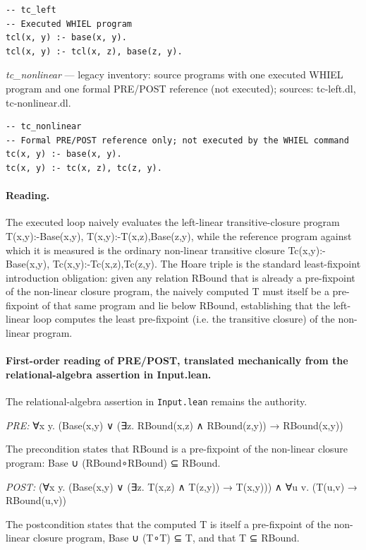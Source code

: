 \documentclass[10pt]{article}
\begin{document}
\begin{Verbatim}[fontsize=\scriptsize,breaklines=true,breakanywhere=true,frame=single,framesep=1.5mm]
-- tc_left
-- Executed WHIEL program
tcl(x, y) :- base(x, y).
tcl(x, y) :- tcl(x, z), base(z, y).
\end{Verbatim}

{\raggedright\textit{tc\_nonlinear} --- legacy inventory: source programs with one executed WHIEL program and one formal PRE/POST reference (not executed); sources: tc-left.dl, tc-nonlinear.dl.\par}

\begin{Verbatim}[fontsize=\scriptsize,breaklines=true,breakanywhere=true,frame=single,framesep=1.5mm]
-- tc_nonlinear
-- Formal PRE/POST reference only; not executed by the WHIEL command
tc(x, y) :- base(x, y).
tc(x, y) :- tc(x, z), tc(z, y).
\end{Verbatim}

\paragraph{Reading.} The executed loop naively evaluates the left-linear transitive-closure program T(x,y):-Base(x,y), T(x,y):-T(x,z),Base(z,y), while the reference program against which it is measured is the ordinary non-linear transitive closure Tc(x,y):-Base(x,y), Tc(x,y):-Tc(x,z),Tc(z,y). The Hoare triple is the standard least-fixpoint introduction obligation: given any relation RBound that is already a pre-fixpoint of the non-linear closure program, the naively computed T must itself be a pre-fixpoint of that same program and lie below RBound, establishing that the left-linear loop computes the least pre-fixpoint (i.e. the transitive closure) of the non-linear program.

\paragraph{First-order reading of PRE/POST, translated mechanically from the relational-algebra assertion in Input.lean.} The relational-algebra assertion in \texttt{Input.lean} remains the authority.

\textit{PRE:} ∀x y. (Base(x,y) ∨ (∃z. RBound(x,z) ∧ RBound(z,y)) → RBound(x,y))\par The precondition states that RBound is a pre-fixpoint of the non-linear closure program: Base ∪ (RBound∘RBound) ⊆ RBound.

\textit{POST:} (∀x y. (Base(x,y) ∨ (∃z. T(x,z) ∧ T(z,y)) → T(x,y))) ∧ ∀u v. (T(u,v) → RBound(u,v))\par The postcondition states that the computed T is itself a pre-fixpoint of the non-linear closure program, Base ∪ (T∘T) ⊆ T, and that T ⊆ RBound.
\end{document}
